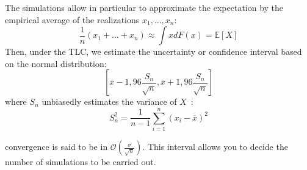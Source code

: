 %
%	
%	
%	
%	
%	
%	
%	
%	
%	

\begin{f}[Simulations]
	
	The simulations allow in particular to approximate the expectation by the empirical average of the realizations \(x_1,\ldots,x_n\):
	\[
	\frac{1}{n}(x_1+\ldots+x_n)\approx \int xdF(x)=\mathbb{E}[X]
	\]
	Then, under the TLC, we estimate the uncertainty or confidence interval based on the normal distribution:
	\[
	\left[\overline{x}-1,96\frac{S_n}{\sqrt{n}},\overline{x}+1,96\frac{S_n}{\sqrt{n}}\right]
	\]
	where \(S_n\) unbiasedly estimates the variance of \(X\)~:
	\[
	S_n^2=\frac{1}{n-1}\sum_{i=1}^{n}(x_i-\overline{x})^2
	\]
	
	convergence is said to be in \(\mathcal{O}(\frac{\sigma}{\sqrt{n}})\).
	This interval allows you to decide the number of simulations to be carried out.
\end{f}

